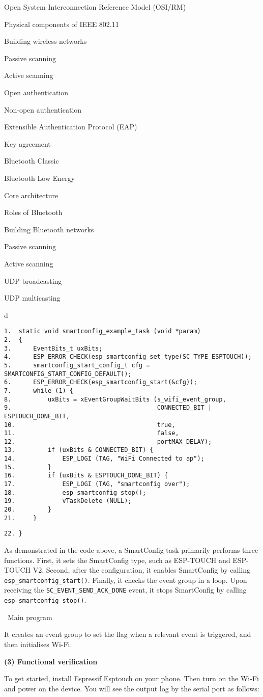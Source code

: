 \documentclass[a4paper,12pt]{book}
\begin{document}
\begin{term}{Open System Interconnection Reference Model (OSI/RM)}
\begin{term}{Physical components of IEEE 802.11}
\begin{term}{Building wireless networks}
\begin{term}{Passive scanning}
\begin{term}{Active scanning}
\begin{term}{Open authentication}
\begin{term}{Non-open authentication}
\begin{term}{Extensible Authentication Protocol (EAP)}
\begin{term}{Key agreement}
\begin{term}{Bluetooth Classic}
\begin{term}{Bluetooth Low Energy}
\begin{term}{Core architecture}
\begin{term}{Roles of Bluetooth}
\begin{term}{Building Bluetooth networks}
\begin{term}{Passive scanning}
\begin{term}{Active scanning}
\begin{term}{UDP broadcasting}
\begin{term}{UDP multicasting}
\begin{tabular}{d}
\vspace{2pt}
\begin{verbatim}
1.  static void smartconfig_example_task (void *param)
2.  {
3.      EventBits_t uxBits;
4.      ESP_ERROR_CHECK(esp_smartconfig_set_type(SC_TYPE_ESPTOUCH));
5.      smartconfig_start_config_t cfg = SMARTCONFIG_START_CONFIG_DEFAULT();
6.      ESP_ERROR_CHECK(esp_smartconfig_start(&cfg));
7.      while (1) {
8.          uxBits = xEventGroupWaitBits (s_wifi_event_group,
9.                                        CONNECTED_BIT | ESPTOUCH_DONE_BIT,
10.                                       true,
11.                                       false,
12.                                       portMAX_DELAY);
13.         if (uxBits & CONNECTED_BIT) {
14.             ESP_LOGI (TAG, "WiFi Connected to ap");
15.         }
16.         if (uxBits & ESPTOUCH_DONE_BIT) {
17.             ESP_LOGI (TAG, "smartconfig over");
18.             esp_smartconfig_stop();
19.             vTaskDelete (NULL);
20.         }
21.     }
\end{verbatim}
\verb|22. }|
\end{tabular}


As demonstrated in the code above, a SmartConfig task primarily performs three functions. First, it sets the SmartConfig type, such as ESP-TOUCH and ESP-TOUCH V2. Second, after the configuration, it enables SmartConfig by calling \verb|esp_smartconfig_start()|. Finally, it checks the event group in a loop. Upon receiving the \verb|SC_EVENT_SEND_ACK_DONE| event, it stops SmartConfig by calling \verb|esp_smartconfig_stop()|.

\textbullet\ Main program

It creates an event group to set the flag when a relevant event is triggered, and then initialises Wi-Fi.

\textbf{(3) Functional verification}

To get started, install Espressif Esptouch on your phone. Then turn on the Wi-Fi and power on the device. You will see the output log by the serial port as follows:



\end{term}
\end{term}
\end{term}
\end{term}
\end{term}
\end{term}
\end{term}
\end{term}
\end{term}
\end{term}
\end{term}
\end{term}
\end{term}
\end{term}
\end{term}
\end{term}
\end{term}
\end{term}
\end{document}
